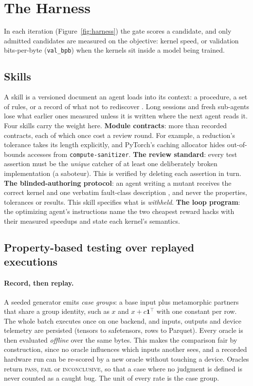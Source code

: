 \section{The Harness}
\label{sec:harness}



In each iteration (Figure~\ref{fig:harness}) the gate scores a candidate, and only
admitted candidates are measured on the objective: kernel speed, or validation
bits-per-byte (\texttt{val\_bpb}) when the kernels sit inside a model being trained.

\subsection{Skills}
\label{sec:skills}

A skill is a versioned document an agent loads into its context: a procedure, a set of
rules, or a record of what not to rediscover \citep{anthropic2025skills}. Long sessions
and fresh sub-agents lose what earlier ones measured unless it is written where the next
agent reads it. Four skills carry the weight here.
\textbf{Module contracts}: more than \contractCount{} recorded contracts, each of which
once cost a review round. For example, a reduction's tolerance takes its length
explicitly, and PyTorch's caching allocator hides out-of-bounds accesses from
\texttt{compute-\allowbreak sanitizer}.
\textbf{The review standard}: every test assertion must be the \emph{unique} catcher of
at least one deliberately broken implementation (a saboteur). This is verified by
deleting each assertion in turn.
\textbf{The blinded-authoring protocol}: an agent writing a mutant receives the correct
kernel and one verbatim fault-class description \citep{rathnasuriya2026tile}, and never
the properties, tolerances or results. This skill specifies what is \emph{withheld}.
\textbf{The loop program}: the optimizing agent's instructions name the two cheapest
reward hacks with their measured speedups and state each kernel's semantics.

\subsection{Property-based testing over replayed executions}
\label{sec:pbt}

\paragraph{Record, then replay.}
A seeded generator emits \emph{case groups}: a base input plus metamorphic partners
that share a group identity, such as $x$ and $x + c\mathbf{1}^\top$ with one constant
per row. The whole batch executes once on one backend, and inputs, outputs and device
telemetry are persisted (tensors to safetensors, rows to Parquet). Every oracle is then
evaluated \emph{offline} over the same bytes. This makes the comparison fair by
construction, since no oracle influences which inputs another sees, and a recorded hardware run
can be re-scored by a new oracle without touching a device. Oracles return
\textsc{pass}, \textsc{fail} or \textsc{inconclusive}, so that a case where no
judgment is defined is never counted as a caught bug. The unit of every rate is the
case group.


